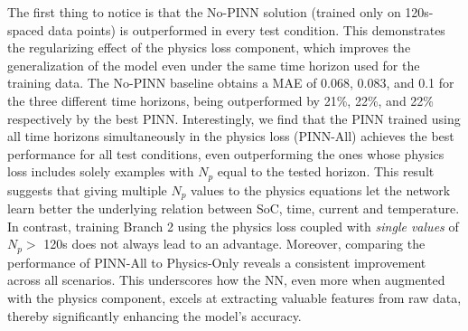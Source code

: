 The first thing to notice is that the No-PINN solution (trained only on 120s-spaced data points) is outperformed in  every test condition.  This demonstrates the regularizing effect of the physics loss component, which improves the generalization of the model even under the same time horizon used for the training data.
%
The No-PINN baseline obtains a MAE of 0.068, 0.083, and 0.1 for the three different time horizons, 
being outperformed by 21\%, 22\%, and 22\% respectively by the best PINN.
Interestingly, we find that the PINN trained using all time horizons simultaneously in the physics loss (PINN-All) achieves the best performance for all test conditions, even outperforming the ones whose physics loss includes solely examples with $N_p$ equal to the tested horizon. This result suggests that giving multiple $N_p$ values to the physics equations let the network learn better the underlying relation between SoC, time, current and temperature.
%
In contrast, training Branch 2 using the physics loss coupled with \textit{single values} of $N_p >$ 120s does not always lead to an advantage.
%
Moreover, comparing the performance of PINN-All to Physics-Only reveals a consistent improvement across all scenarios. This underscores how the NN, even more when augmented with the physics component, excels at extracting valuable features from raw data, thereby significantly enhancing the model's accuracy.
%

